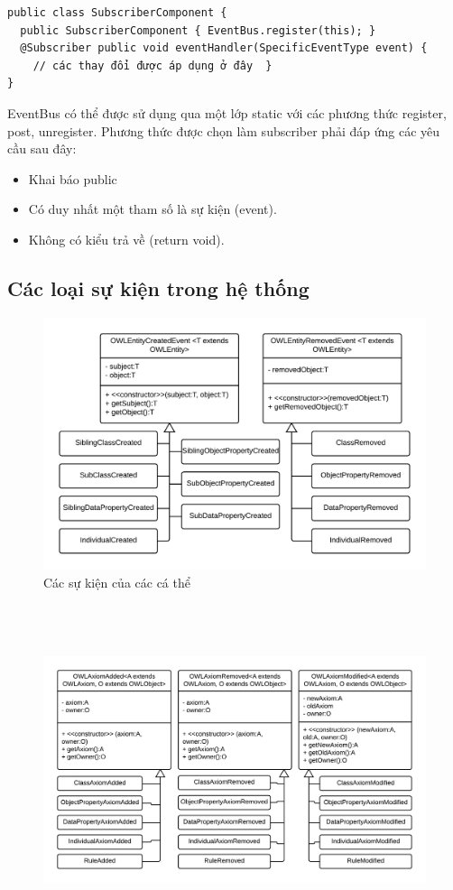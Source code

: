 {\begin{verbatim}
public class SubscriberComponent {
  public SubscriberComponent { EventBus.register(this); }
  @Subscriber public void eventHandler(SpecificEventType event) { 
  	// các thay đổi được áp dụng ở đây  }
}
\end{verbatim}
EventBus có thể được sử dụng qua một lớp static với các phương thức register, post, unregister. Phương thức được chọn làm subscriber phải đáp ứng các yêu cầu sau đây:
\begin{itemize}
\item Khai báo public
\item Có duy nhất một tham số là sự kiện (event).
\item Không có kiểu trả về (return void).
\end{itemize}
\subsection{Các loại sự kiện trong hệ thống}
\begin{figure}[h!]
	\centering
	\includegraphics[width=150mm]{Figures/uml_entity_event.png}
	\caption{Các sự kiện của các cá thể\label{overflow}}
\end{figure}
\begin{figure}[h!]
	\centering
	\includegraphics[height=97mm]{Figures/uml_axiom_event.png}

\end{figure}}
